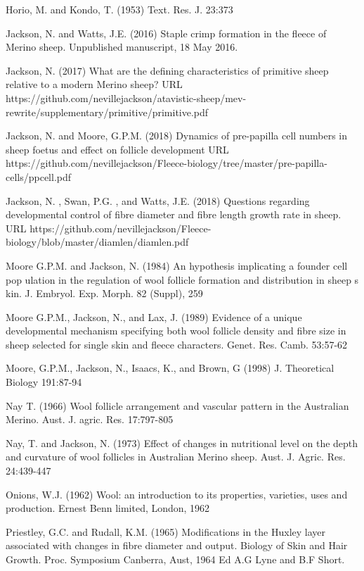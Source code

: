 \documentclass[titlepage]{article}  %
\begin{document}
\begin{thebibliography}{99}
Horio, M. and Kondo, T. (1953) Text. Res. J. 23:373

Jackson, N. and Watts, J.E. (2016) Staple crimp formation in the fleece of Merino sheep. Unpublished manuscript, 18 May 2016.

Jackson, N. (2017) What are the defining characteristics of primitive sheep relative to a modern Merino sheep? URL https://github.com/nevillejackson/atavistic-sheep/mev-rewrite/supplementary/primitive/primitive.pdf

Jackson, N. and Moore, G.P.M. (2018)
Dynamics of pre-papilla cell numbers in sheep foetus and effect on follicle development URL https://github.com/nevillejackson/Fleece-biology/tree/master/pre-papilla-cells/ppcell.pdf

Jackson, N. , Swan, P.G. , and Watts, J.E. (2018) Questions regarding developmental control of fibre diameter and fibre length growth rate in sheep. URL https://github.com/nevillejackson/Fleece-biology/blob/master/diamlen/diamlen.pdf

Moore G.P.M. and Jackson, N. (1984) An hypothesis implicating a founder cell pop
ulation in the regulation of wool follicle formation and distribution in sheep s
kin. J. Embryol. Exp. Morph. 82 (Suppl), 259

Moore G.P.M., Jackson, N., and Lax, J. (1989) Evidence of a unique developmental mechanism specifying both wool follicle density and fibre size in sheep selected for single skin and fleece characters. Genet. Res. Camb. 53:57-62

Moore, G.P.M., Jackson, N., Isaacs, K., and Brown, G (1998) J. Theoretical Biology 191:87-94

Nay T. (1966) Wool follicle arrangement and vascular pattern in the Australian Merino. Aust. J. agric. Res. 17:797-805

Nay, T. and Jackson, N. (1973) Effect of changes in nutritional level on the depth and curvature of wool follicles in Australian Merino sheep. Aust. J. Agric. Res. 24:439-447

Onions, W.J. (1962) Wool: an introduction to its properties, varieties, uses
     and production. Ernest Benn limited, London, 1962

Priestley, G.C. and Rudall, K.M. (1965) Modifications in the Huxley layer associated with changes in fibre diameter and output. Biology of Skin and Hair Growth. Proc. Symposium Canberra, Aust, 1964 Ed A.G Lyne and B.F Short.


\end{thebibliography}
\end{document}
